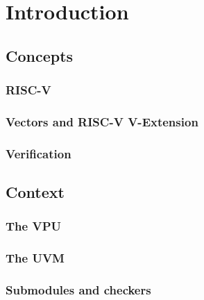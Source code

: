 \chapter{Introduction}

\section{Concepts}
\subsection{RISC-V}
\subsection{Vectors and RISC-V V-Extension}
\subsection{Verification}

\section{Context}
\subsection{The VPU}
\subsection{The UVM}
\subsection{Submodules and checkers}